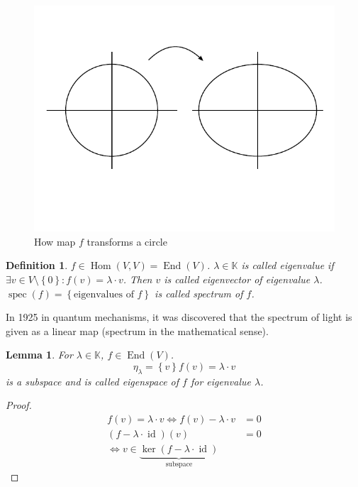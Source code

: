 \documentclass{article}
\newtheorem{definition}{Definition}  \numberwithin{definition}{section}
\newtheorem{lemma}{Lemma}  \numberwithin{lemma}{section}
\newcommand{\set}[1]{\left\{#1\right\}}
\begin{document}
\begin{figure}[t]
  \begin{center}
    \includegraphics{img/15_screwing_map.pdf}
    \caption{How map $f$ transforms a circle}
  \end{center}
\end{figure}

\begin{definition} %
  $f \in \operatorname{Hom}(V, V) = \operatorname{End}(V)$.
  $\lambda \in \mathbb K$ is called \emph{eigenvalue} if
  $\exists v \in V \setminus \set{0}: f(v) = \lambda \cdot v$.
  Then $v$ is called \emph{eigenvector} of eigenvalue $\lambda$.
  $\operatorname{spec}(f) = \set{\text{eigenvalues of } f}$ is called \emph{spectrum of $f$}.
\end{definition}

In 1925 in quantum mechanisms, it was discovered that the spectrum of light is given as a linear map (spectrum in the mathematical sense).

\begin{lemma}
  For $\lambda \in \mathbb K$, $f \in \operatorname{End}(V)$.
  \[ \eta_{\lambda} = \set{v}{f(v) = \lambda \cdot v} \]
  is a subspace and is called eigenspace of $f$ for eigenvalue $\lambda$.
\end{lemma}
\begin{proof}
  \begin{align*}
    f(v) = \lambda \cdot v \iff f(v) - \lambda \cdot v &= 0 \\
    (f - \lambda \cdot \operatorname{id}) (v) &= 0 \\
    \iff v \in \underbrace{\operatorname{ker}(f - \lambda \cdot \operatorname{id})}_{\text{subspace}} &
  \end{align*}
\end{proof}
\end{document}
